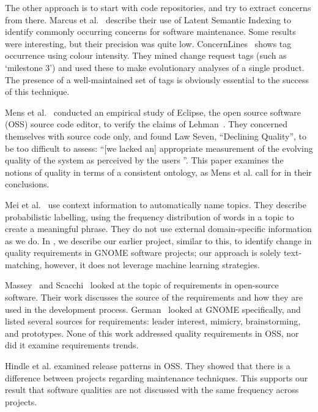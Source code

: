 \documentclass[]{sig-alternate}
\begin{document}
The other approach is to start with code repositories, and try to extract concerns from there. Marcus et al.~\cite{marcus04wcre} describe their use of Latent Semantic Indexing to identify commonly occurring concerns for software maintenance. Some results were interesting, but their precision was quite low. ConcernLines~\cite{treude09cl} shows tag occurrence using colour intensity. They mined change request tags (such as `milestone 3') and used these to make evolutionary analyses of a single product. The presence of a well-maintained set of tags is obviously essential to the success of this technique.

Mens et al.~\cite{mens08icsm} conducted an empirical study of Eclipse, the open source software (OSS) source code editor, to verify the claims of Lehman~\cite{lehman97sms}. They concerned themselves with source code only, and found Law Seven, ``Declining Quality'', to be too difficult to assess: ``[we lacked an] appropriate measurement of the evolving quality of the system as perceived by the users \cite[p. 388]{mens08icsm}''. This paper examines the notions of quality in terms of a consistent ontology, as Mens et al. call for in their conclusions.

Mei et al.~\cite{Mei2007} use context information to automatically name topics. They describe probabilistic labelling, using the frequency distribution of words in a topic to create a meaningful phrase. They do not use external domain-specific information as we do.
In \cite{ernst10refsq}, we describe our earlier project, similar to this, to identify change in quality requirements in GNOME software projects; our approach is solely text-matching, however, it does not leverage machine learning strategies.

Massey~\cite{massey02icse} and Scacchi~\cite{scacchi02,scacchi05b} looked at the topic of requirements in open-source software. Their work discusses the source of the requirements and how they are used in the development process. German~\cite{german03gnome} looked at GNOME specifically, and listed several sources for requirements: leader interest, mimicry, brainstorming, and prototypes. None of this work  addressed quality requirements in OSS, nor did it examine requirements trends.

Hindle et al. \cite{Hindle2007} examined release patterns in OSS. They showed that there is a difference between projects regarding maintenance techniques. This supports our result that software qualities are not discussed with the same frequency across projects.
\end{document}
